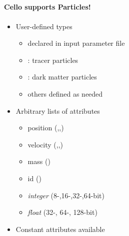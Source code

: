 \NEWSEC

\subsection{\ssRecentParticles}

\begin{frame}[fragile,label=ss-recent-particles] 
  \secframetitle{\ssRecentParticles}
  \framesubtitle{Cello supports Particles!}

\begin{minipage}{2.5in}
\begin{itemize}
\item User-defined types
\begin{itemize}
        \item  declared in input parameter file
        \item  {}: tracer particles
        \item  {}: dark matter particles
        \item  others defined as needed
\end{itemize}
\item Arbitrary lists of attributes
\begin{itemize}
        \item  position (,,)
        \item  velocity (,,)
        \item  mass ()
        \item  id ()
        \item \textit{integer} (8-,16-,32-,64-bit)
        \item \textit{float}   (32-, 64-, 128-bit)
        \end{itemize}
\item Constant attributes available
\end{itemize}
\end{minipage} \
\begin{minipage}{2.0in}
\end{minipage}
\end{frame}


